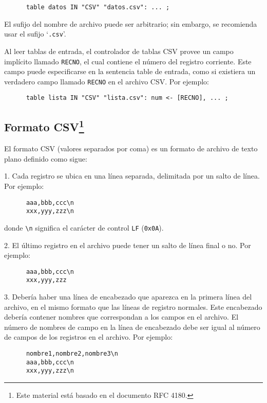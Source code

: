 \documentclass[11pt,spanish]{report}
\begin{document}
\begin{verbatim}
      table datos IN "CSV" "datos.csv": ... ;
\end{verbatim}

El sufijo del nombre de archivo puede ser arbitrario; sin embargo, se recomienda usar el sufijo `\verb|.csv|'.

\newpage

Al leer tablas de entrada, el controlador de tablas CSV provee un campo implícito llamado \verb|RECNO|, el cual contiene el número del registro corriente. Este campo puede especificarse en la sentencia table de entrada, como si existiera un verdadero campo llamado \verb|RECNO| en el archivo CSV. Por ejemplo:

\begin{verbatim}
      table lista IN "CSV" "lista.csv": num <- [RECNO], ... ;
\end{verbatim}

\subsection*{Formato CSV\footnote{Este material está basado en el documento RFC 4180.}}

El formato CSV (valores separados por coma) es un formato de archivo de texto plano definido como sigue:

1. Cada registro se ubica en una línea separada, delimitada por un salto de línea. Por ejemplo:

\begin{verbatim}
      aaa,bbb,ccc\n
      xxx,yyy,zzz\n
\end{verbatim}

\noindent
donde \verb|\n| significa el carácter de control \verb|LF| ({\tt 0x0A}).

2. El último registro en el archivo puede tener un salto de línea final o no. Por ejemplo:

\begin{verbatim}
      aaa,bbb,ccc\n
      xxx,yyy,zzz
\end{verbatim}

3. Debería haber una línea de encabezado que aparezca en la primera línea del archivo, en el mismo formato que las líneas de registro normales. Este encabezado debería contener nombres que correspondan a los campos en el archivo. El número de nombres de campo en la línea de encabezado debe ser igual al número de campos de los registros en el archivo. Por ejemplo:

\begin{verbatim}
      nombre1,nombre2,nombre3\n
      aaa,bbb,ccc\n
      xxx,yyy,zzz\n
\end{verbatim}
\end{document}
